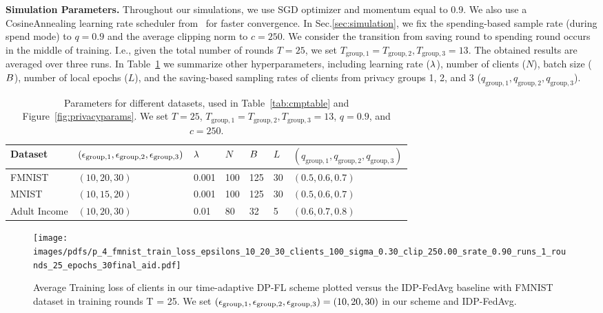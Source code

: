{\textbf{Simulation Parameters.} Throughout our simulations, we use SGD optimizer and momentum equal to 0.9. We also use a CosineAnnealing learning rate scheduler from~\citep{inproceedings} for faster convergence. In Sec.\ref{sec:simulation}, we fix the spending-based sample rate (during spend mode) to $q= 0.9$ and the average clipping norm to $c=250$. We consider the transition from saving round to spending round occurs in the middle of training. I.e., given the total number of rounds $T=25$, we set $T_{\text{group},1}= T_{\text{group},2}, T_{\text{group},3}=13$. The obtained results are averaged over three runs. In Table~\ref{tab:hyperparamstable} we summarize other hyperparameters, including learning rate ($\lambda$), number of clients ($N$), batch size ($B$), number of local epochs ($L$), and the saving-based sampling rates of clients from privacy groups 1, 2, and 3 ($q_{\text{group},1}, q_{\text{group},2}, q_{\text{group},3}$). 

\begin{table}[htbp]
    \centering
    \caption{Parameters for different datasets, used in Table~\ref{tab:cmptable} and Figure~\ref{fig:privacyparams}. We set $T=25$, $T_{\text{group},1}= T_{\text{group},2}, T_{\text{group},3}=13$, $q=0.9$, and $c=250$. }
    \label{tab:hyperparamstable}
    \begin{tabular}{p{2.5cm}p{2.8cm}p{0.7cm}p{0.7cm}p{0.7cm}p{0.7cm}p{2.8cm}}
        \toprule
        \textbf{Dataset} &  {\scriptsize $({\epsilon}_{\text{group},1}, {\epsilon}_{\text{group},2}, {\epsilon}_{\text{group},3})$} & $\lambda$ & $N$ & $B$  & $L$ & {\scriptsize $(q_{\text{group},1},q_{\text{group},2},q_{\text{group},3})$} \\
        \midrule
        FMNIST  & $(10,20,30)$ & 0.001  & 100 & 125  & 30 & $(0.5,0.6,0.7)$   \\
        MNIST & $(10,15,20)$   & 0.001  & 100 & 125  & 30 & $(0.5,0.6,0.7)$  \\
        Adult Income & $(10,20,30)$ & 0.01 & 80 & 32 & 5 & $(0.6,0.7,0.8)$   \\
        \bottomrule
    \end{tabular}
\end{table}



\begin{figure}[!htbp]
    \centering
    
    \vspace{5pt}
        \centering
        \texttt{[image: images/pdfs/p\_4\_fmnist\_train\_loss\_epsilons\_10\_20\_30\_clients\_100\_sigma\_0.30\_clip\_250.00\_srate\_0.90\_runs\_1\_rounds\_25\_epochs\_30final\_aid.pdf]} 
        \caption{
        {Average Training loss of clients in our time-adaptive DP-FL scheme plotted versus the IDP-FedAvg baseline with FMNIST dataset in training rounds T = 25. We set $({\epsilon}_{\text{group},1}, {\epsilon}_{\text{group},2}, {\epsilon}_{\text{group},3})=(10,20,30)$ in our scheme and IDP-FedAvg.}}
        \label{fig:trainloss}  
\end{figure}


}
